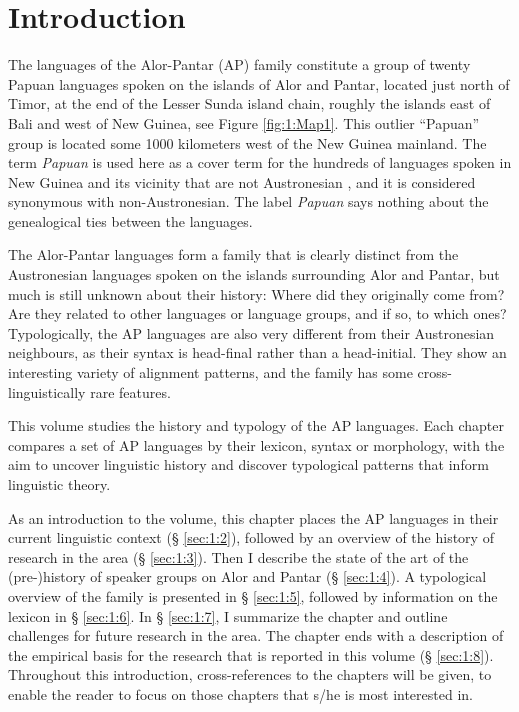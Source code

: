 
\section{Introduction}\label{sec:1:1}
The languages of the Alor-Pantar (AP) family constitute a group of twenty Papuan languages spoken on the islands of Alor and Pantar, located just north of Timor, at the end of the Lesser Sunda island chain, roughly the islands east of Bali and west of New Guinea, see Figure \ref{fig:1:Map1}. This outlier ``Papuan'' group is located some 1000 kilometers west of the New Guinea mainland. The term \textit{Papuan} is used here as a cover term for the hundreds of languages spoken in New Guinea and its vicinity that are not Austronesian \citep[15]{Ross2005}, and it is considered synonymous with non-Austronesian. The label \textit{Papuan} says nothing about the genealogical ties between the languages. 

The Alor-Pantar languages form a family that is clearly distinct from the Austronesian languages spoken on the islands surrounding Alor and Pantar, but much is still unknown about their history: Where did they originally come from? Are they related to other languages or language groups, and if so, to which ones? Typologically, the AP languages are also very different from their Austronesian neighbours, as their syntax is head-final rather than a head-initial. They show an interesting variety of alignment patterns, and the family has some cross-linguistically rare features.  

This volume studies the history and typology of the AP languages. Each chapter compares a set of AP languages by their lexicon, syntax or morphology, with the aim to uncover linguistic history and discover typological patterns that inform linguistic theory. 

As an introduction to the volume, this chapter places the AP languages in their current linguistic context ({\S{}} \ref{sec:1:2}), followed by an overview of the history of research in the area ({\S{}} \ref{sec:1:3}). Then I describe the state of the art of the (pre-)history of speaker groups on Alor and Pantar ({\S{}} \ref{sec:1:4}). A typological overview of the family is presented in {\S{}} \ref{sec:1:5}, followed by information on the lexicon in {\S{}} \ref{sec:1:6}. In {\S{}} \ref{sec:1:7}, I summarize the chapter and outline challenges for future research in the area. The chapter ends with a description of the empirical basis for the research that is reported in this volume ({\S{}} \ref{sec:1:8}). Throughout this introduction, cross-references to the chapters will be given, to enable the reader to focus on those chapters that s/he is most interested in. 



